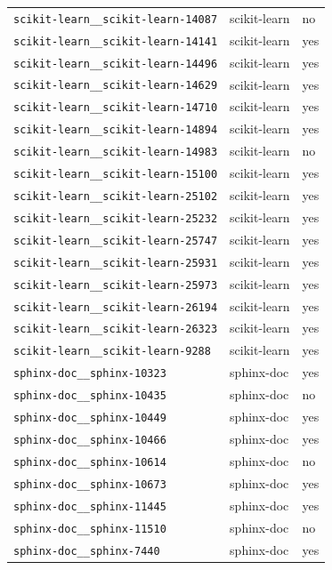 \begin{longtable}{@{}p{}lp{}@{}}
\texttt{scikit-learn\_\_scikit-learn-14087} & scikit-learn & no \\
\texttt{scikit-learn\_\_scikit-learn-14141} & scikit-learn & yes \\
\texttt{scikit-learn\_\_scikit-learn-14496} & scikit-learn & yes \\
\texttt{scikit-learn\_\_scikit-learn-14629} & scikit-learn & yes \\
\texttt{scikit-learn\_\_scikit-learn-14710} & scikit-learn & yes \\
\texttt{scikit-learn\_\_scikit-learn-14894} & scikit-learn & yes \\
\texttt{scikit-learn\_\_scikit-learn-14983} & scikit-learn & no \\
\texttt{scikit-learn\_\_scikit-learn-15100} & scikit-learn & yes \\
\texttt{scikit-learn\_\_scikit-learn-25102} & scikit-learn & yes \\
\texttt{scikit-learn\_\_scikit-learn-25232} & scikit-learn & yes \\
\texttt{scikit-learn\_\_scikit-learn-25747} & scikit-learn & yes \\
\texttt{scikit-learn\_\_scikit-learn-25931} & scikit-learn & yes \\
\texttt{scikit-learn\_\_scikit-learn-25973} & scikit-learn & yes \\
\texttt{scikit-learn\_\_scikit-learn-26194} & scikit-learn & yes \\
\texttt{scikit-learn\_\_scikit-learn-26323} & scikit-learn & yes \\
\texttt{scikit-learn\_\_scikit-learn-9288} & scikit-learn & yes \\
\texttt{sphinx-doc\_\_sphinx-10323} & sphinx-doc & yes \\
\texttt{sphinx-doc\_\_sphinx-10435} & sphinx-doc & no \\
\texttt{sphinx-doc\_\_sphinx-10449} & sphinx-doc & yes \\
\texttt{sphinx-doc\_\_sphinx-10466} & sphinx-doc & yes \\
\texttt{sphinx-doc\_\_sphinx-10614} & sphinx-doc & no \\
\texttt{sphinx-doc\_\_sphinx-10673} & sphinx-doc & yes \\
\texttt{sphinx-doc\_\_sphinx-11445} & sphinx-doc & yes \\
\texttt{sphinx-doc\_\_sphinx-11510} & sphinx-doc & no \\
\texttt{sphinx-doc\_\_sphinx-7440} & sphinx-doc & yes \\

\end{longtable}
